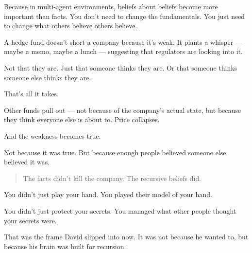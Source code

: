 Because in multi-agent environments, beliefs about beliefs become more important than facts.
You don’t need to change the fundamentals.
You just need to change what others believe others believe.

A hedge fund doesn’t short a company because it’s weak.
It plants a whisper — maybe a memo, maybe a lunch — suggesting that regulators are looking into it.

Not that they are.
Just that someone thinks they are.
Or that someone thinks someone else thinks they are.

That’s all it takes.

Other funds pull out — not because of the company’s actual state,
but because they think everyone else is about to.
Price collapses.

And the weakness becomes true.

Not because it was true.
But because enough people believed someone else believed it was.

\begin{quote}
The facts didn’t kill the company.
The recursive beliefs did.
\end{quote}

You didn’t just play your hand.
You played their model of your hand.

You didn’t just protect your secrets.
You managed what other people thought your secrets were.

That was the frame David slipped into now. It was not because he wanted to, but because his 
brain was built for recursion.

\medskip

